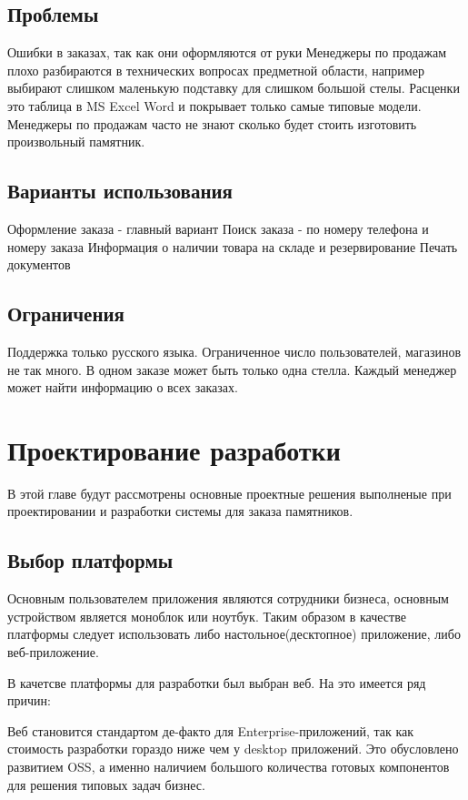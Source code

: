 \documentclass[a4paper,article,14pt]{extarticle}
\begin{document}
\subsection{Проблемы}

Ошибки в заказах, так как они оформляются от руки 
Менеджеры по продажам плохо разбираются в технических вопросах предметной области, например выбирают слишком маленькую подставку для слишком большой стелы.
Расценки это таблица в MS Excel Word и покрывает только самые типовые модели. 
Менеджеры по продажам часто не знают сколько будет стоить изготовить произвольный памятник.


\subsection{Варианты использования}

Оформление заказа - главный вариант 
Поиск заказа - по номеру телефона и номеру заказа
Информация о наличии товара на складе и резервирование
Печать документов

\subsection{Ограничения}

Поддержка только русского языка.
Ограниченное число пользователей, магазинов не так много.
В одном заказе может быть только одна стелла.
Каждый менеджер может найти информацию о всех заказах.

\section{Проектирование разработки}

В этой главе будут рассмотрены основные проектные решения выполненые при проектировании и разработки системы для заказа памятников.

\subsection{Выбор платформы}

Основным пользователем приложения являются сотрудники бизнеса, основным устройством является моноблок или ноутбук.
Таким образом в качестве платформы следует использовать либо настольное(десктопное) приложение, либо веб-приложение.

В качетсве платформы для разработки был выбран веб. На это имеется ряд причин:

Веб становится стандартом де-факто для Enterprise-приложений, так как стоимость разработки гораздо ниже чем у desktop приложений.
Это обусловлено развитием OSS, а именно наличием большого количества готовых компонентов для решения типовых задач бизнес.
\end{document}
